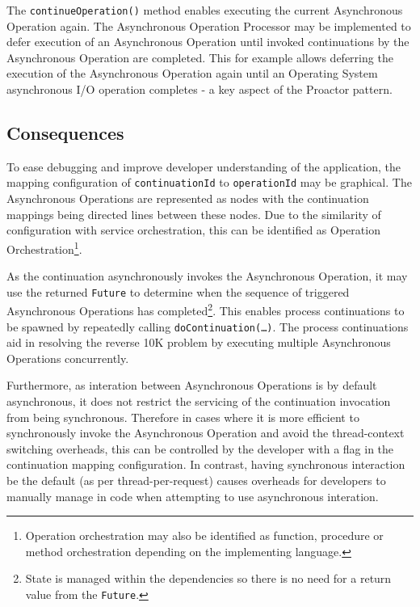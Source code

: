 \documentclass[prodmode]{style/acmlarge}
\begin{document}
The \texttt{continueOperation()} method enables executing the current
Asynchronous Operation again.  The Asynchronous Operation Processor may be
implemented to defer execution of an Asynchronous Operation until invoked
continuations by the Asynchronous Operation are completed.  This for example
allows deferring the execution of the Asynchronous Operation again until an
Operating System asynchronous I/O operation completes - a key aspect of the
Proactor pattern.


\subsection{Consequences}

To ease debugging and improve developer understanding of the application, the
mapping configuration of \texttt{continuationId} to \texttt{operationId} may be
graphical.  The Asynchronous Operations are represented as nodes with the
continuation mappings being directed lines between these nodes.  Due to the
similarity of configuration with service orchestration, this can be identified
as Operation Orchestration\footnote{Operation orchestration may also be
identified as function, procedure or method orchestration depending on the
implementing language.}.

As the continuation asynchronously invokes the Asynchronous Operation, it may
use the returned \texttt{Future} to determine when the sequence of triggered
Asynchronous Operations has completed\footnote{State is managed within the
dependencies so there is no need for a return value from the \texttt{Future}.}.
This enables process continuations \cite{process-continuation} to be spawned by
repeatedly calling \texttt{doContinuation(\ldots)}.  The process continuations
aid in resolving the reverse 10K problem \cite{reverse-ten-k-problem} by
executing multiple Asynchronous Operations concurrently.

Furthermore, as interation between Asynchronous Operations is by default
asynchronous, it does not restrict the servicing of the continuation invocation
from being synchronous.  Therefore in cases where it is more efficient to
synchronously invoke the Asynchronous Operation and avoid the thread-context
switching overheads, this can be controlled by the developer with a flag in the
continuation mapping configuration.  In contrast, having synchronous interaction
be the default (as per thread-per-request) causes overheads for developers to
manually manage in code when attempting to use asynchronous interation.
\end{document}
